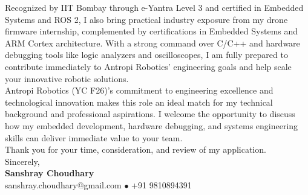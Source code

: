 \documentclass[10pt,a4paper]{article}%
\begin{document}
\noindent Recognized by IIT Bombay through e-Yantra Level 3 and certified in Embedded Systems and ROS 2, I also bring practical industry exposure from my drone firmware internship, complemented by certifications in Embedded Systems and ARM Cortex architecture. With a strong command over C/C++ and hardware debugging tools like logic analyzers and oscilloscopes, I am fully prepared to contribute immediately to Antropi Robotics' engineering goals and help scale your innovative robotic solutions. \vspace{8pt}\\

\noindent Antropi Robotics (YC F26)'s commitment to engineering excellence and technological innovation makes this role an ideal match for my technical background and professional aspirations. I welcome the opportunity to discuss how my embedded development, hardware debugging, and systems engineering skills can deliver immediate value to your team. \vspace{8pt}\\%

\noindent Thank you for your time, consideration, and review of my application. \vspace{18pt}\\%

\noindent Sincerely, \vspace{8pt}\\%
\textbf{Sanshray Choudhary} \\%
sanshray.choudhary@gmail.com $\bullet$ +91 9810894391 \\%
\end{document}
